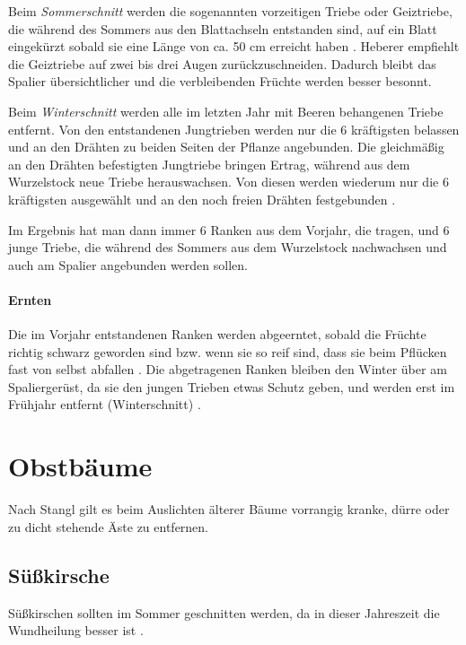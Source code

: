 Beim \textit{Sommerschnitt} werden die sogenannten vorzeitigen Triebe oder Geiztriebe, die während des Sommers aus den Blattachseln entstanden sind, auf ein Blatt eingekürzt sobald sie eine Länge von ca. 50 cm erreicht haben \cite[S.~196]{Stangl1995}.
Heberer \cite[S.~108]{Heberer2018} empfiehlt die Geiztriebe auf zwei bis drei Augen zurückzuschneiden.
Dadurch bleibt das Spalier übersichtlicher und die verbleibenden Früchte werden besser besonnt.

Beim \textit{Winterschnitt} werden alle im letzten Jahr mit Beeren behangenen Triebe entfernt.
Von den entstandenen Jungtrieben werden nur die 6 kräftigsten belassen und an den Drähten zu beiden Seiten der Pflanze angebunden.
Die gleichmäßig an den Drähten befestigten Jungtriebe bringen Ertrag, während aus dem Wurzelstock neue Triebe herauswachsen.
Von diesen werden wiederum nur die 6 kräftigsten ausgewählt und an den noch freien Drähten festgebunden \cite[S.~197]{Stangl1995}.

Im Ergebnis hat man dann immer 6 Ranken aus dem Vorjahr, die tragen, und 6 junge Triebe, die während des Sommers aus dem Wurzelstock nachwachsen und auch am Spalier angebunden werden sollen.

\paragraph{Ernten}

Die im Vorjahr entstandenen Ranken werden abgeerntet, sobald die Früchte richtig schwarz geworden sind bzw. wenn sie so reif sind, dass sie beim Pflücken fast von selbst abfallen \cite[S.~176]{Seymour1978}.
Die abgetragenen Ranken bleiben den Winter über am Spaliergerüst, da sie den jungen Trieben etwas Schutz geben, und werden erst im Frühjahr entfernt (\textrightarrow Winterschnitt) \cite[S.~197]{Stangl1995}.

\vfill
\pagebreak

\section{Obstbäume}
\label{Bäume}

Nach Stangl \cite[S.~256]{Stangl1995} gilt es beim Auslichten älterer Bäume vorrangig kranke, dürre oder zu dicht stehende Äste zu entfernen.

\subsection{Süßkirsche}
\label{Süßkirsche}

Süßkirschen sollten im Sommer geschnitten werden, da in dieser Jahreszeit die Wundheilung besser ist \cite[S.~109]{Heberer2018}.



\pagebreak